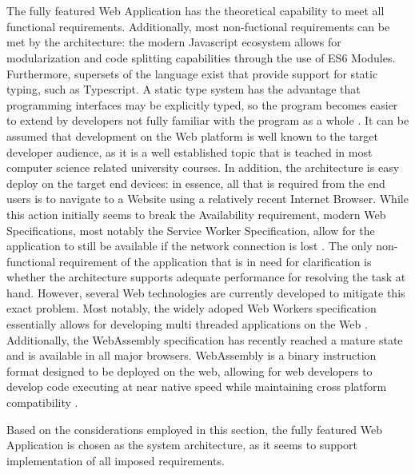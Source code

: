 \\\\
The fully featured Web Application has the theoretical capability to meet all functional requirements. Additionally, most non-fuctional requirements can be met by the architecture: the modern Javascript ecosystem allows for modularization and code splitting capabilities through the use of ES6 Modules. Furthermore, supersets of the language exist that provide support for static typing, such as Typescript. A static type system has the advantage that programming interfaces may be explicitly typed, so the program becomes easier to extend by developers not fully familiar with the program as a whole \cite{TypescriptUnderstanding}. It can be assumed that development on the Web platform is well known to the target developer audience, as it is a well established topic that is teached in most computer science related university courses. In addition, the architecture is easy deploy on the target end devices: in essence, all that is required from the end users is to navigate to a Website using a relatively recent Internet Browser. While this action initially seems to break the Availability requirement, modern Web Specifications, most notably the Service Worker Specification, allow for the application to still be available if the network connection is lost \cite{serviceworkersdraft}. The only non-functional requirement of the application that is in need for clarification is whether the architecture supports adequate performance for resolving the task at hand. However, several Web technologies are currently developed to mitigate this exact problem. Most notably, the widely adoped Web Workers specification essentially allows for developing multi threaded applications on the Web \cite{workerdraft}. Additionally, the WebAssembly specification has recently reached a mature state and is available in all major browsers. WebAssembly is a binary instruction format designed to be deployed on the web, allowing for web developers to develop code executing at near native speed while maintaining cross platform compatibility \cite{wasmdraft}.

Based on the considerations employed in this section, the fully featured Web Application is chosen as the system architecture, as it seems to support implementation of all imposed requirements.


